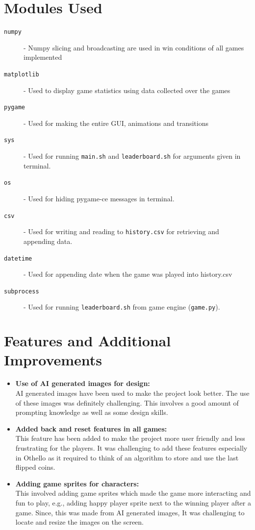 \documentclass{article}
\begin{document}
\section{Modules Used}
\begin{description}
    \item[\texttt{numpy}] - Numpy slicing and broadcasting are used in win conditions of all games implemented
    \item[\texttt{matplotlib}] - Used to display game statistics using data collected over the games
    \item[\texttt{pygame}] - Used for making the entire GUI, animations and transitions
    \item[\texttt{sys}] - Used for running \texttt{main.sh} and \texttt{leaderboard.sh} for arguments given in terminal.
    \item[\texttt{os}] - Used for hiding pygame-ce messages in terminal.
    \item[\texttt{csv}] - Used for writing and reading to \texttt{history.csv} for retrieving and appending data.
    \item[\texttt{datetime}] - Used for appending date when the game was played into history.csv
    \item[\texttt{subprocess}] - Used for running \texttt{leaderboard.sh} from game engine (\texttt{game.py}).
\end{description}

\section{Features and Additional Improvements}
\begin{itemize}
    \item \textbf{Use of AI generated images for design:}
    \\
    AI generated images have been used to make the project look better. The use of these images was definitely challenging. This involves a good amount of prompting knowledge as well as some design skills.
    \item \textbf{Added back and reset features in all games:}
    \\
    This feature has been added to make the project more user friendly and less frustrating for the players. It was challenging to add these features especially in Othello as it required to think of an algorithm to store and use the last flipped coins.
    \item \textbf{Adding game sprites for characters:}
    \\
    This involved adding game sprites which made the game more interacting and fun to play, e.g., adding happy player sprite next to the winning player after a game. Since, this was made from AI generated images, It was challenging to locate and resize the images on the screen.
\end{itemize}
\end{document}
